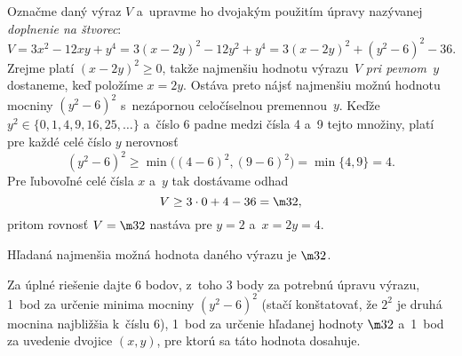 {%
Označme daný výraz $V$ a~upravme ho dvojakým použitím úpravy nazývanej {\it doplnenie na
štvorec\/}:
$$
V=3x^2-12xy+y^4=3(x-2y)^2-12y^2+y^4=3(x-2y)^2+(y^2-6)^2-36.
$$
Zrejme platí $(x-2y)^2\ge0$, takže najmenšiu hodnotu výrazu~$V$
{\it pri pevnom~$y$} dostaneme, keď položíme $x=2y$.
Ostáva preto nájsť najmenšiu možnú hodnotu mocniny $(y^2-6)^2$
s~nezápornou celočíselnou premennou~$y$. Keďže
$y^2\in\{0, 1, 4, 9, 16, 25,\dots\}$ a~číslo 6 padne medzi čísla 4 a~9
tejto množiny, platí pre každé celé číslo $y$ nerovnosť
$$
(y^2-6)^2\ge\min\bigl((4-6)^2,(9-6)^2\bigr)=\min\{4,9\}=4.
$$
Pre ľubovoľné celé čísla $x$ a~$y$ tak dostávame odhad
$$
V\ge 3\cdot0+4-36=\m32,
$$
pritom rovnosť $V=\m32$ nastáva pre $y=2$ a~$x=2y=4$.

\odpoved
Hľadaná najmenšia možná hodnota daného výrazu je
$\m32$.

\nobreak\medskip\petit\noindent
Za úplné riešenie dajte 6 bodov, z~toho 3 body za potrebnú úpravu
výrazu, 1~bod za určenie minima mocniny $(y^2-6)^2$ (stačí
konštatovať, že $2^2$ je druhá mocnina najbližšia k~číslu 6),
1~bod za určenie hľadanej hodnoty $\m32$ a~1~bod za uvedenie
dvojice $(x,y)$, pre ktorú sa táto hodnota dosahuje.

\endpetit
\bigbreak
}

